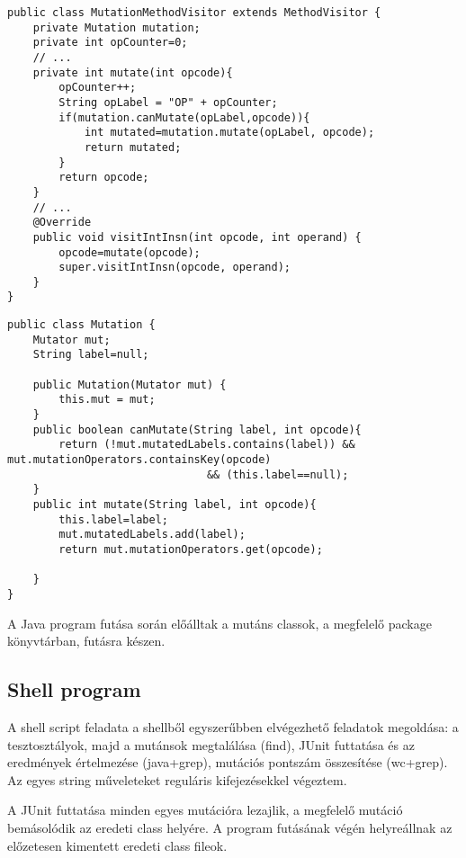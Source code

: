 \begin{lstlisting}[frame=single,float=!ht,caption={MutationMethodVisitor},captionpos=b,label={lst:tool_mutationmethodvisitor}]
public class MutationMethodVisitor extends MethodVisitor {
    private Mutation mutation;
    private int opCounter=0;
    // ...
    private int mutate(int opcode){
        opCounter++;
        String opLabel = "OP" + opCounter;
        if(mutation.canMutate(opLabel,opcode)){
            int mutated=mutation.mutate(opLabel, opcode);
            return mutated;
        }
        return opcode;
    }
    // ...
    @Override
    public void visitIntInsn(int opcode, int operand) {
        opcode=mutate(opcode);
        super.visitIntInsn(opcode, operand);
    }
}
\end{lstlisting}

\begin{lstlisting}[frame=single,float=!ht,caption={A Mutation osztály},captionpos=b,label={lst:tool_mutation_class}]
public class Mutation {
    Mutator mut;
    String label=null;

    public Mutation(Mutator mut) {
        this.mut = mut;
    }
    public boolean canMutate(String label, int opcode){
        return (!mut.mutatedLabels.contains(label)) && mut.mutationOperators.containsKey(opcode) 
                               && (this.label==null);
    }
    public int mutate(String label, int opcode){
        this.label=label;
        mut.mutatedLabels.add(label);
        return mut.mutationOperators.get(opcode);

    }
}
\end{lstlisting}
A Java program futása során előálltak a mutáns classok, a megfelelő package könyvtárban, futásra készen.
\subsection{Shell program}
A shell script feladata a shellből egyszerűbben elvégezhető feladatok megoldása: a tesztosztályok, majd a mutánsok megtalálása (find), JUnit futtatása és az eredmények értelmezése (java+grep), mutációs pontszám összesítése (wc+grep). Az egyes string műveleteket reguláris kifejezésekkel végeztem.

A JUnit futtatása minden egyes mutációra lezajlik, a megfelelő mutáció bemásolódik az eredeti class helyére.  A program futásának végén helyreállnak az előzetesen kimentett eredeti class fileok.

